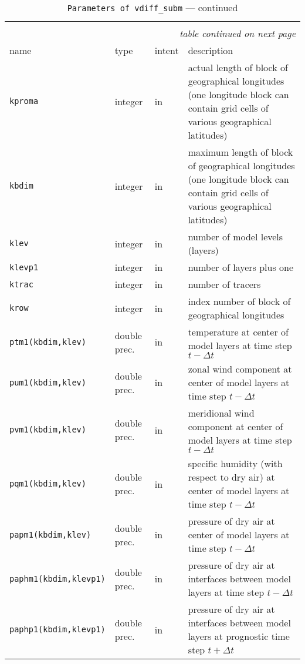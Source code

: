 \begin{longtable}{l@{\extracolsep\fill}llp{7.0cm}}
\hline\hline\caption[Parameters of {\tt vdiff\_subm}]{Parameter list
  of arguments passed to {\tt vdiff\_subm}}\\\hline\label{tabpvdiff_subm}
\endfirsthead
\caption[]{{\tt Parameters of {\tt vdiff\_subm}} --- continued}\\\hline
\endhead
\hline\multicolumn{4}{r}{\slshape table continued on next page}\\
\endfoot
\hline %
\endlastfoot
name & type & intent & description \\\hline
{\tt kproma} & integer & in & actual length of
block of geographical longitudes (one longitude block can contain grid
cells of various geographical latitudes)\\
{\tt kbdim} &  integer & in & maximum length of block of
geographical longitudes (one longitude block can contain grid cells of
various geographical latitudes)\\
{\tt klev} &  integer & in & number of model levels (layers)\\
{\tt klevp1} &  integer & in & number of layers plus one \\
{\tt ktrac} &  integer & in & number of tracers \\
{\tt krow} &  integer & in & index number of block of geographical
longitudes\\ 
{\tt ptm1(kbdim,klev)} & double prec. & in & temperature at center of
model layers at time step $t-\Delta t$\\
{\tt pum1(kbdim,klev)} & double prec. & in & zonal wind component at
center of model layers at time step $t-\Delta t$ \\
{\tt pvm1(kbdim,klev)} & double prec. & in & meridional wind component at
center of model layers at time step $t-\Delta t$ \\
{\tt pqm1(kbdim,klev)} & double prec. & in & specific humidity (with
respect to dry air) at
center of model layers at time step $t-\Delta t$ \\
{\tt papm1(kbdim,klev)} & double prec. & in & pressure of dry air at center of model
layers at time step $t-\Delta t$\\
{\tt paphm1(kbdim,klevp1)} & double prec. & in & pressure of dry air at
interfaces between model layers at time step $t-\Delta t$\\
{\tt paphp1(kbdim,klevp1)} & double prec. & in & pressure of dry air at
interfaces between model layers at prognostic time step $t+\Delta t$\\

\end{longtable}
